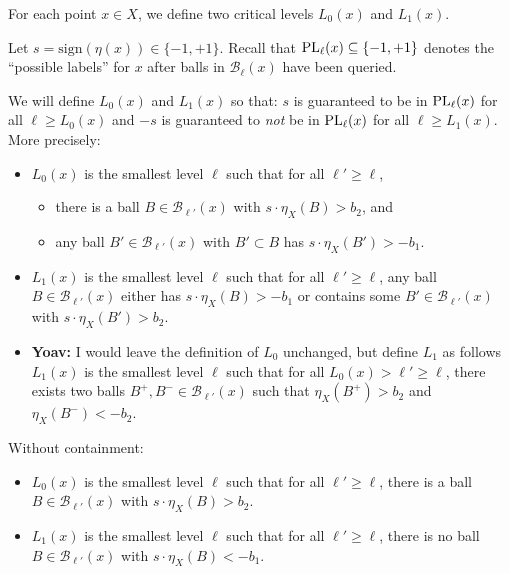 \documentclass{article}
\def\B{{\mathcal B}}
\def\PL{{\rm PL}}
\newcommand{\yoav}[1]{{\color{blue} {\bf Yoav:} #1}}
\begin{document}
For each point $x \in X$, we define two critical levels $L_0(x)$ and $L_1(x)$. 

Let $s = \mbox{sign}(\eta(x)) \in \{-1, +1\}$. Recall that $\PL_\ell(x) \subseteq \{-1,+1\}$ denotes the ``possible labels'' for $x$ after balls in $\B_\ell(x)$ have been queried.

We will define $L_0(x)$ and $L_1(x)$ so that: $s$ is guaranteed to be in $\PL_\ell(x)$ for all $\ell \geq L_0(x)$ and $-s$ is guaranteed to \emph{not} be in $\PL_\ell(x)$ for all $\ell \geq L_1(x)$. More precisely:
\begin{itemize}
\item $L_0(x)$ is the smallest level $\ell$ such that for all $\ell' \geq \ell$,
\begin{itemize}
\item there is a ball $B \in \B_{\ell'}(x)$ with $s \cdot \eta_X(B) > b_2$, and
\item any ball $B' \in \B_{\ell'}(x)$ with $B' \subset B$ has $s \cdot \eta_X(B') > -b_1$.
\end{itemize}
\item $L_1(x)$ is the smallest level $\ell$ such that for all $\ell' \geq \ell$, any ball $B \in \B_{\ell'}(x)$ either has $s \cdot \eta_X(B) > -b_1$ or contains some $B' \in \B_{\ell'}(x)$ with $s \cdot \eta_X(B') > b_2$.
\item \yoav{I would leave the definition of $L_0$ unchanged, but define $L_1$ as follows} $L_1(x)$ is the smallest level $\ell$ such that for all $L_0(x) > \ell' \geq \ell$, 
there exists two balls $B^+,B^- \in \B_{\ell'}(x)$ such that $\eta_X(B^+) > b_2$ and $\eta_X(B^-) < -b_2$.
\end{itemize}

Without containment:
\begin{itemize}
\item $L_0(x)$ is the smallest level $\ell$ such that for all $\ell' \geq \ell$, there is a ball $B \in \B_{\ell'}(x)$ with $s \cdot \eta_X(B) > b_2$.
\item $L_1(x)$ is the smallest level $\ell$ such that for all $\ell' \geq \ell$, there is no ball $B \in \B_{\ell'}(x)$ with $s \cdot \eta_X(B) < -b_1$.
\end{itemize}
\end{document}

